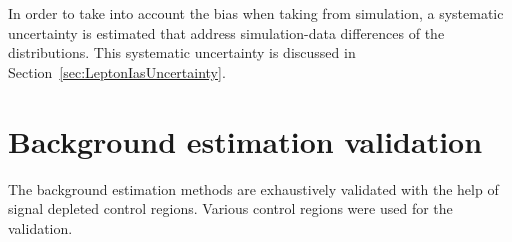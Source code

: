 In order to take into account the bias when taking \ias from simulation, a systematic uncertainty is estimated that address simulation-data differences of the \ias distributions.
This systematic uncertainty is discussed in Section~\ref{sec:LeptonIasUncertainty}.
\section{Background estimation validation}
\label{sec:BkgValidation}

The background estimation methods are exhaustively validated with the help of signal depleted control regions.
Various control regions were used for the validation.

